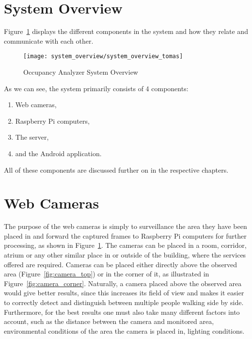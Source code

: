 \section{System Overview}
Figure~\ref{fig:system_overview} displays the different components in the system and how they relate and communicate with each other.
\begin{figure}[ht]
	\centering
	\texttt{[image: system\_overview/system\_overview\_tomas]}
	\caption{Occupancy Analyzer System Overview}
	\label{fig:system_overview}
\end{figure}

As we can see, the system primarily consists of 4 components:

\begin{enumerate}
	\item Web cameras,
	\item Raspberry Pi computers,
	\item The server,
	\item and the Android application.
\end{enumerate}

All of these components are discussed further on in the respective chapters.

\section{Web Cameras}
The purpose of the web cameras is simply to surveillance the area they have been placed in and forward the captured frames to Raspberry Pi computers for further processing, as shown in Figure~\ref{fig:system_overview}. The cameras can be placed in a room, corridor, atrium or any other similar place in or outside of the building, where the services offered are required. Cameras can be placed either directly above the observed area (Figure~\ref{fig:camera_top}) or in the corner of it, as illustrated in Figure~\ref{fig:camera_corner}. Naturally, a camera placed above the observed area would give better results, since this increases its field of view and makes it easier to correctly detect and distinguish between multiple people walking side by side. Furthermore, for the best results one must also take many different factors into account, such as the distance between the camera and monitored area, environmental conditions of the area the camera is placed in, lighting conditions.

